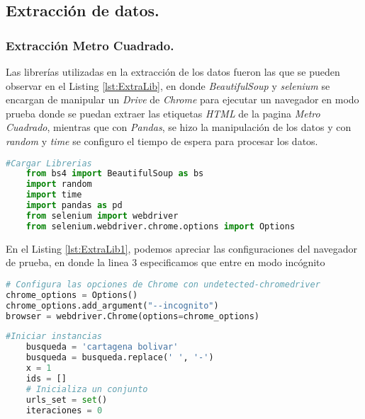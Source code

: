 \documentclass[12pt,a4paper]{article}
\begin{document}
\subsection{Extracción de datos.}
\subsubsection{Extracción Metro Cuadrado.}
Las librerías utilizadas en la extracción de los datos fueron las que se pueden observar en el Listing \ref{lst:ExtraLib}, en donde \textit{BeautifulSoup} y \textit{selenium} se encargan de manipular un \textit{Drive} de \textit{Chrome} para ejecutar un navegador en modo prueba donde se puedan extraer las etiquetas \textit{HTML} de la pagina \textit{Metro Cuadrado}, mientras que con \textit{Pandas}, se hizo la manipulación de los datos y con \textit{random} y \textit{time} se configuro el tiempo de espera para procesar los datos.
\begin{lstlisting}[language=Python, caption={Librerias Cargadas para la extracción}, label={lst:ExtraLib}]
	#Cargar Librerias
	from bs4 import BeautifulSoup as bs
	import random
	import time
	import pandas as pd
	from selenium import webdriver
	from selenium.webdriver.chrome.options import Options
\end{lstlisting}

En el Listing \ref{lst:ExtraLib1}, podemos apreciar las configuraciones del navegador de prueba, en donde la linea 3 especificamos que entre en modo incógnito
\begin{lstlisting}[language=Python, caption={Configuración del navegador}, label={lst:ExtraLib1}]
# Configura las opciones de Chrome con undetected-chromedriver
chrome_options = Options()
chrome_options.add_argument("--incognito")
browser = webdriver.Chrome(options=chrome_options)
\end{lstlisting}

\begin{lstlisting}[language=Python, caption={Inicializador de instancias}, label={lst:ExtraLib2}]
	#Iniciar instancias
	busqueda = 'cartagena bolivar'
	busqueda = busqueda.replace(' ', '-')
	x = 1
	ids = []
	# Inicializa un conjunto
	urls_set = set()
	iteraciones = 0
\end{lstlisting}
\end{document}

